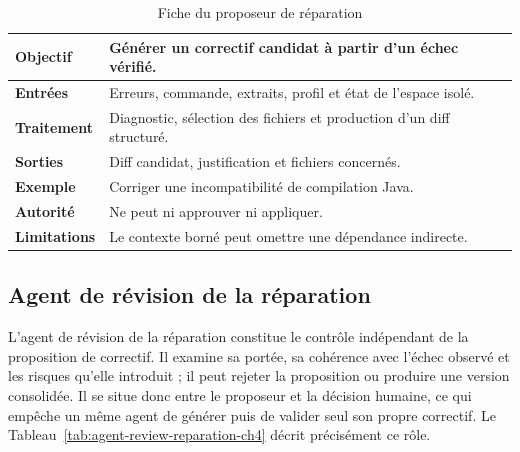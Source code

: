 \begin{table}[H]
    \centering
    \caption{Fiche du proposeur de réparation}
    \label{tab:agent-proposeur-reparation-ch4}
    \small
    \begin{tabularx}{\textwidth}{|>{\bfseries\RaggedRight\arraybackslash}p{3.1cm}|>{\RaggedRight\arraybackslash}X|}
        \hline
        Objectif & Générer un correctif candidat à partir d'un échec vérifié. \\
        \hline
        Entrées & Erreurs, commande, extraits, profil et état de l'espace isolé. \\
        \hline
        Traitement & Diagnostic, sélection des fichiers et production d'un diff structuré. \\
        \hline
        Sorties & Diff candidat, justification et fichiers concernés. \\
        \hline
        Exemple & Corriger une incompatibilité de compilation Java. \\
        \hline
        Autorité & Ne peut ni approuver ni appliquer. \\
        \hline
        Limitations & Le contexte borné peut omettre une dépendance indirecte. \\
        \hline
    \end{tabularx}
\end{table}

\subsection{Agent de révision de la réparation}

L'agent de révision de la réparation constitue le contrôle indépendant de la proposition de correctif. Il examine sa portée, sa cohérence avec l'échec observé et les risques qu'elle introduit ; il peut rejeter la proposition ou produire une version consolidée. Il se situe donc entre le proposeur et la décision humaine, ce qui empêche un même agent de générer puis de valider seul son propre correctif. Le Tableau~\ref{tab:agent-review-reparation-ch4} décrit précisément ce rôle.

